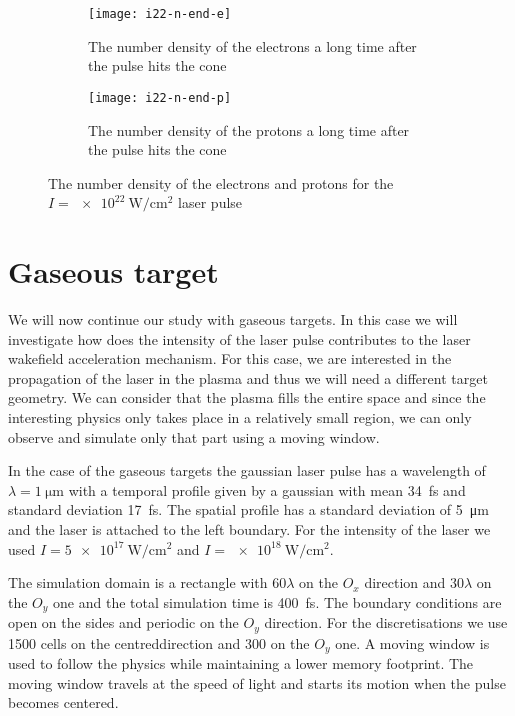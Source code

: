 \documentclass[12pt, class=report, crop=false]{standalone}
\begin{document}
\begin{figure}[h]
  \centering
  \begin{subfigure}[b]{0.475\textwidth}
    \centering
    \texttt{[image: i22-n-end-e]}
    \caption{The number density of the electrons a long time after the pulse
    hits the cone}%
  \end{subfigure}
  \hfill
  \begin{subfigure}[b]{0.475\textwidth}
    \centering
    \texttt{[image: i22-n-end-p]}
    \caption{The number density of the protons a long time after the pulse
    hits the cone}%
  \end{subfigure}
  \caption{The number density of the electrons and protons for the
  \(I=\SI{e22}{\watt\per\centi\metre\squared}\) laser pulse}%
  \label{fig:cone-22-number-density}%
\end{figure}

\section{Gaseous target}

We will now continue our study with gaseous targets. In this case
we will investigate how does the intensity of the laser pulse
contributes to the laser wakefield acceleration mechanism.
For this case, we are interested in the propagation of the laser
in the plasma and thus we will need a different target geometry.
We can consider that the plasma fills the entire space and since
the interesting physics only takes place in a relatively small
region, we can only observe and simulate only that part using a moving window.

In the case of the gaseous targets the gaussian laser pulse has a
wavelength of \(\lambda=\SI{1}{\micro\metre}\) with a temporal profile
given by a gaussian with mean \SI{34}{\femto\second} and standard deviation
\SI{17}{\femto\second}. The spatial profile has a standard deviation of
\SI{5}{\micro\metre} and the laser is attached to the left boundary.
For the intensity of the laser we used \(I=\SI{5e17}{\watt\per\centi\metre\squared}\)
and \(I=\SI{e18}{\watt\per\centi\metre\squared}\).

The simulation domain is a rectangle with \(60\lambda\) on the \(O_x\)
direction and \(30\lambda\) on the \(O_y\) one and the total simulation time
is \SI{400}{\femto\second}. The boundary conditions are open on the sides
and periodic on the \(O_y\) direction.
For the discretisations we use 1500 cells on the
centreddirection and 300 on the \(O_y\) one. A moving window is used to follow
the physics while maintaining a lower memory footprint. The moving window
travels at the speed of light and starts its motion when the pulse becomes
centered.
\end{document}
